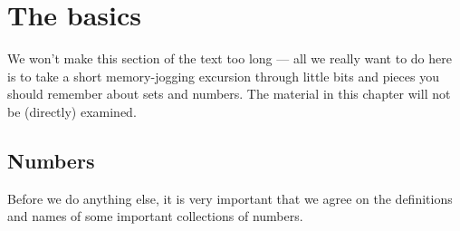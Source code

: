 %
%
\graphicspath{{./figures/basic/}}

\chapter{The basics}
\label{chap basics}
We won't make this section of the text too long --- all we really want to do
here is to take a short memory-jogging excursion through little bits and
pieces you should remember about sets and numbers. The material in this chapter will not
be (directly) examined.


\section{Numbers}
Before we do anything else, it is very important that we agree on the definitions
and names of some important collections of numbers.

